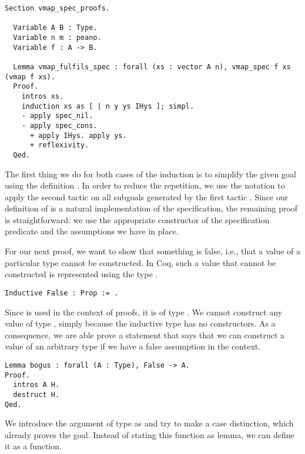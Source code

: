 \begin{verbatim}
Section vmap_spec_proofs.

  Variable A B : Type.
  Variable n m : peano.
  Variable f : A -> B.

  Lemma vmap_fulfils_spec : forall (xs : vector A n), vmap_spec f xs (vmap f xs).
  Proof.
    intros xs.
    induction xs as [ | n y ys IHys ]; simpl.
    - apply spec_nil.
    - apply spec_cons.
      + apply IHys. apply ys.
      + reflexivity.
  Qed.
\end{verbatim}

The first thing we do for both cases of the induction is to simplify the given goal using the definition .
In order to reduce the repetition, we use the notation  to apply the second tactic  on all subgoals generated by the first tactic .
Since our definition of  is a natural implementation of the specification, the remaining proof is straightforward: we use the appropriate constructor of the specification predicate and the assumptions we have in place.

For our next proof, we want to show that something is false, i.e., that a value of a particular type cannot be constructed.
In Coq, such a value that cannot be constructed is represented using the type .

\begin{verbatim}
Inductive False : Prop := .
\end{verbatim}

Since  is used in the context of proofs, it is of type .
We cannot construct any value of type , simply because the inductive type has no constructors.
As a consequence, we are able prove a statement that says that we can construct a value of an arbitrary type if we have a false assumption in the context.

\begin{verbatim}
Lemma bogus : forall (A : Type), False -> A.
Proof.
  intros A H.
  destruct H.
Qed.
\end{verbatim}

We introduce the argument of type  as  and try to make a case distinction, which already proves the goal.
Instead of stating this function as lemma, we can define it as a function.

